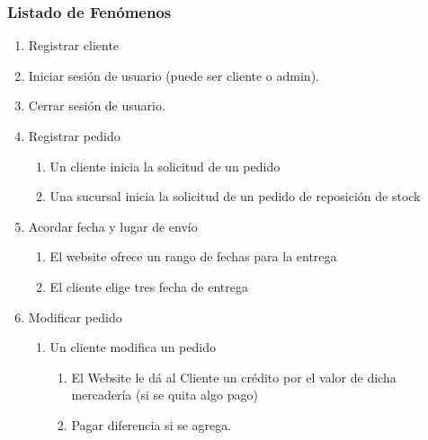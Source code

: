     \subsubsection{Listado de Fenómenos}
    \begin{enumerate}

      \item Registrar cliente

      \item Iniciar sesión de usuario (puede ser cliente o admin).

      \item Cerrar sesión de usuario.

      \item Registrar pedido

      \begin{enumerate}

        \item Un cliente inicia la solicitud de un pedido

        \item Una sucursal inicia la solicitud de un pedido de reposición de
        stock

      \end{enumerate}

      \item Acordar fecha y lugar de envío

      \begin{enumerate}

        \item El website ofrece un rango de fechas para la entrega

        \item El cliente elige tres fecha de entrega

      \end{enumerate}

      \item Modificar pedido

      \begin{enumerate}

        \item Un cliente modifica un pedido

        \begin{enumerate}

          \item El Website le dá al Cliente un crédito por el valor de dicha
          mercadería (si se quita algo pago)

          \item Pagar diferencia si se agrega.


\end{enumerate}
\end{enumerate}
\end{enumerate}
